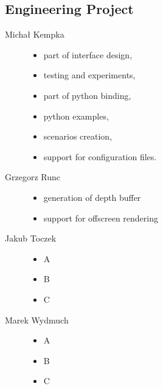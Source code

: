 	\subsection{Engineering Project}
	\begin{description}
		\item[Michał Kempka] \hfill
			\begin{itemize}
				\item part of interface design,
				\item testing and experiments,
				\item part of python binding,
				\item python examples,
				\item scenarios creation,
				\item support for configuration files.
			\end{itemize}
		\item[Grzegorz Runc] \hfill
			\begin{itemize}
				\item generation of depth buffer
				\item support for offscreen rendering
			\end{itemize}
		\item[Jakub Toczek] \hfill
			\begin{itemize}
				\item A
				\item B
				\item C
			\end{itemize}
		\item[Marek Wydmuch] \hfill
			\begin{itemize}
				\item A
				\item B
				\item C
			\end{itemize}
	\end{description}
	
   	
